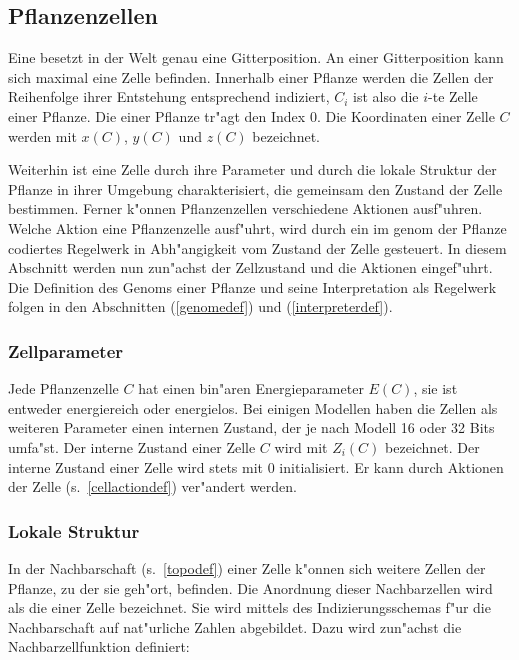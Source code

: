 \subsection{Pflanzenzellen}
\label{celldef}

Eine  besetzt in der Welt genau eine Gitterposition. An einer
Gitterposition kann sich maximal eine Zelle befinden. Innerhalb einer Pflanze werden
die Zellen der Reihenfolge ihrer Entstehung entsprechend indiziert, $C_i$ ist also
die $i$-te Zelle einer Pflanze. Die  einer Pflanze tr"agt den Index 0.
Die Koordinaten einer Zelle $C$ werden mit $x(C)$, $y(C)$
und $z(C)$ bezeichnet.

Weiterhin ist eine
Zelle durch ihre Parameter und durch die lokale Struktur der Pflanze in
ihrer Umgebung charakterisiert, die gemeinsam den Zustand der Zelle bestimmen.
Ferner k"onnen Pflanzenzellen verschiedene Aktionen ausf"uhren. Welche Aktion eine
Pflanzenzelle ausf"uhrt, wird durch ein im genom der Pflanze codiertes Regelwerk in
Abh"angigkeit vom Zustand der Zelle gesteuert. In diesem Abschnitt werden nun zun"achst
der Zellzustand und die Aktionen eingef"uhrt. Die Definition des Genoms einer Pflanze
und seine Interpretation als Regelwerk folgen in den Abschnitten (\ref{genomedef})
und (\ref{interpreterdef}).


\subsubsection{Zellparameter}

Jede Pflanzenzelle $C$ hat einen bin"aren Energieparameter $E(C)$, sie ist entweder
energiereich oder energielos. Bei einigen Modellen haben die 
Zellen als weiteren Parameter einen internen Zustand, der je nach Modell 16 oder
32 Bits umfa"st. Der interne Zustand einer Zelle $C$ wird mit $Z_i(C)$ bezeichnet.
Der interne Zustand einer Zelle wird stets mit 0 initialisiert. Er kann durch Aktionen
der Zelle (s.\ \ref{cellactiondef}) ver"andert werden.

\subsubsection{Lokale Struktur}

In der Nachbarschaft (s.\ \ref{topodef}) einer Zelle k"onnen sich weitere
Zellen der Pflanze, zu der sie geh"ort, befinden. Die Anordnung dieser
Nachbarzellen wird als die  einer Zelle bezeichnet. Sie wird
mittels des Indizierungsschemas f"ur die Nachbarschaft auf
nat"urliche Zahlen abgebildet. Dazu wird zun"achst die Nachbarzellfunktion
definiert:

